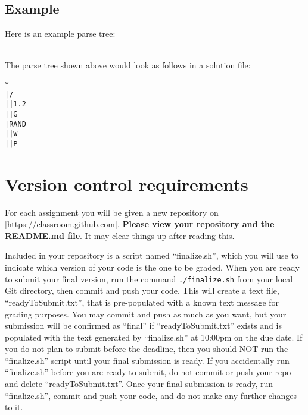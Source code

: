 \documentclass{article}
\begin{document}
\subsection*{Example}
Here is an example parse tree:\\

\\

\noindent The parse tree shown above would look as follows in a solution file: 
\begin{verbatim}
* 
|/ 
||1.2 
||G 
|RAND 
||W 
||P 
\end{verbatim}



\section*{Version control requirements}
For each assignment you will be given a new repository on [\url{https://classroom.github.com}]. \textbf{Please view your repository and the README.md file}. It may clear things up after reading this.

Included in your repository is a script named ``finalize.sh'', which you will use to indicate which version of your code is the one to be graded. When you are ready to submit your final version, run the command \texttt{./finalize.sh} from your local Git directory, then commit and push your code. This will create a text file, ``readyToSubmit.txt'', that is pre-populated with a known text message for grading purposes. You may commit and push as much as you want, but your submission will be confirmed as ``final'' if  ``readyToSubmit.txt'' exists and is populated with the text generated by ``finalize.sh'' at 10:00pm on the due date. If you do not plan to submit before the deadline, then you should NOT run the ``finalize.sh'' script until your final submission is ready. If you accidentally run ``finalize.sh'' before you are ready to submit, do not commit or push your repo and delete ``readyToSubmit.txt''. Once your final submission is ready, run ``finalize.sh'', commit and push your code, and do not make any further changes to it.
\end{document}
